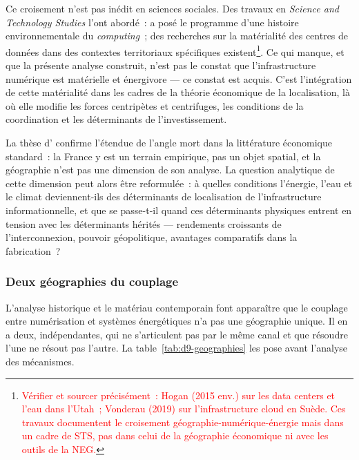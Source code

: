 Ce croisement n'est pas inédit en sciences sociales. Des travaux en \emph{Science and Technology Studies} l'ont abordé~: \textcite{ensmenger_environmental_2018} a posé le programme d'une histoire environnementale du \emph{computing}~; des recherches sur la matérialité des centres de données dans des contextes territoriaux spécifiques existent\footnote{\textcolor{red}{Vérifier et sourcer précisément~: Hogan (2015 env.) sur les data centers et l'eau dans l'Utah~; Vonderau (2019) sur l'infrastructure cloud en Suède. Ces travaux documentent le croisement géographie-numérique-énergie mais dans un cadre de STS, pas dans celui de la géographie économique ni avec les outils de la NEG.}}. Ce qui manque, et que la présente analyse construit, n'est pas le constat que l'infrastructure numérique est matérielle et énergivore --- ce constat est acquis. C'est l'intégration de cette matérialité dans les cadres de la théorie économique de la localisation, là où elle modifie les forces centripètes et centrifuges, les conditions de la coordination et les déterminants de l'investissement.

La thèse d'\textcite{aubouin_economie_2023} confirme l'étendue de l'angle mort dans la littérature économique standard~: la France y est un terrain empirique, pas un objet spatial, et la géographie n'est pas une dimension de son analyse. La question analytique de cette dimension peut alors être reformulée~: à quelles conditions l'énergie, l'eau et le climat deviennent-ils des déterminants de localisation de l'infrastructure informationnelle, et que se passe-t-il quand ces déterminants physiques entrent en tension avec les déterminants hérités --- rendements croissants de l'interconnexion, pouvoir géopolitique, avantages comparatifs dans la fabrication~?


\subsubsection{Deux géographies du couplage}

L'analyse historique et le matériau contemporain font apparaître que le couplage entre numérisation et systèmes énergétiques n'a pas une géographie unique. Il en a deux, indépendantes, qui ne s'articulent pas par le même canal et que résoudre l'une ne résout pas l'autre. La table~\ref{tab:d9-geographies} les pose avant l'analyse des mécanismes.

